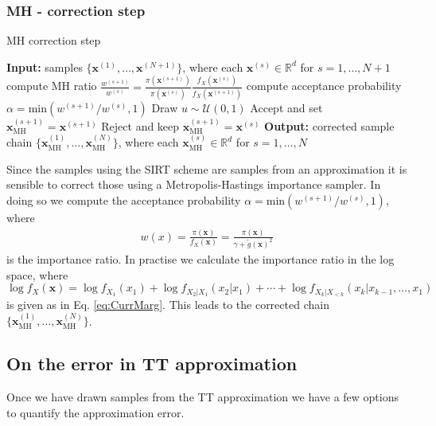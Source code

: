 \subsubsection{MH - correction step}
\begin{algorithm}[!ht]
	\caption{MH correction step}
	\begin{algorithmic}[1]
		\STATE \textbf{Input:} samples $\{ \bm{x}^{(1)},\dots, \bm{x}^{(N+1)} \} $, where each $\bm{x}^{(s)} \in \mathbb{R}^d$ for $s = 1, \dots, N+1$
		\STATE compute MH ratio $\frac{w^{(s+1)}}{w^{(s)} } =\frac{\pi(\bm{x}^{(s+1)})}{\pi(\bm{x}^{(s)})} \frac{f_X(\bm{x}^{(s)})}{f_X(\bm{x}^{(s+1)})}$ 
		\STATE compute acceptance probability $\alpha = \text{min}(w^{(s+1)}/w^{(s)}, 1)$ 
		\STATE Draw $u \sim \mathcal{U}(0,1)$
		\STATE Accept and set $\bm{x}_{\text{MH}}^{(s+1)} = \bm{x}^{(s+1)}$
		\ELSE  
		\STATE Reject and keep $\bm{x}_{\text{MH}}^{(s+1)} = \bm{x}^{(s)}$
		\ENDIF
		\ENDFOR
		\STATE \textbf{Output:} corrected sample chain $\{ \bm{x}_{\text{MH}}^{(1)},\dots, \bm{x}_{\text{MH}}^{(N)} \} $, where each $\bm{x}_{\text{MH}}^{(s)} \in \mathbb{R}^d$ for $s = 1, \dots, N$
	\end{algorithmic}
	\label{alg:SIRT}
\end{algorithm}
Since the samples using the SIRT scheme are samples from an approximation it is sensible to correct those using a Metropolis-Hastings importance sampler.
In doing so we compute the acceptance probability $  \alpha = \text{min}(w^{(s+1)}/w^{(s)}, 1)$, where 
\begin{align}
	w(x) = \frac{\pi(\bm{x})}{f_X(\bm{x})} = \frac{\pi(\bm{x})}{\gamma + \tilde{g}(\bm{x})^2} 
\end{align}
is the importance ratio.
In practise we calculate the importance ratio in the log space, where $\log f_X(\bm{x})  =  \log f_{X_1}(x_1) + \log f_{X_2|X_1}(x_2|x_1) + \cdots + \log f_{X_k|X_{<k}}(x_k|x_{k-1},\dots,x_1)$ is given as in Eq. \ref{eq:CurrMarg}.
This leads to the corrected chain $ \{ \bm{x}_{\text{MH}}^{(1)},\dots, \bm{x}_{\text{MH}}^{(N)} \} $.


\subsection{On the error in TT approximation}
Once we have drawn samples from the TT approximation we have a few options to quantify the approximation error.

